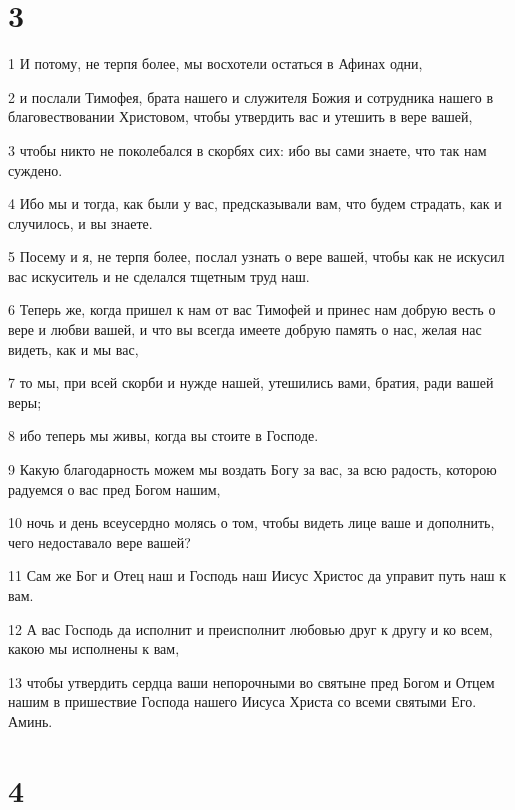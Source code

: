 \chapter{3}

\par 1 И потому, не терпя более, мы восхотели остаться в Афинах одни,
\par 2 и послали Тимофея, брата нашего и служителя Божия и сотрудника нашего в благовествовании Христовом, чтобы утвердить вас и утешить в вере вашей,
\par 3 чтобы никто не поколебался в скорбях сих: ибо вы сами знаете, что так нам суждено.
\par 4 Ибо мы и тогда, как были у вас, предсказывали вам, что будем страдать, как и случилось, и вы знаете.
\par 5 Посему и я, не терпя более, послал узнать о вере вашей, чтобы как не искусил вас искуситель и не сделался тщетным труд наш.
\par 6 Теперь же, когда пришел к нам от вас Тимофей и принес нам добрую весть о вере и любви вашей, и что вы всегда имеете добрую память о нас, желая нас видеть, как и мы вас,
\par 7 то мы, при всей скорби и нужде нашей, утешились вами, братия, ради вашей веры;
\par 8 ибо теперь мы живы, когда вы стоите в Господе.
\par 9 Какую благодарность можем мы воздать Богу за вас, за всю радость, которою радуемся о вас пред Богом нашим,
\par 10 ночь и день всеусердно молясь о том, чтобы видеть лице ваше и дополнить, чего недоставало вере вашей?
\par 11 Сам же Бог и Отец наш и Господь наш Иисус Христос да управит путь наш к вам.
\par 12 А вас Господь да исполнит и преисполнит любовью друг к другу и ко всем, какою мы исполнены к вам,
\par 13 чтобы утвердить сердца ваши непорочными во святыне пред Богом и Отцем нашим в пришествие Господа нашего Иисуса Христа со всеми святыми Его. Аминь.

\chapter{4}

